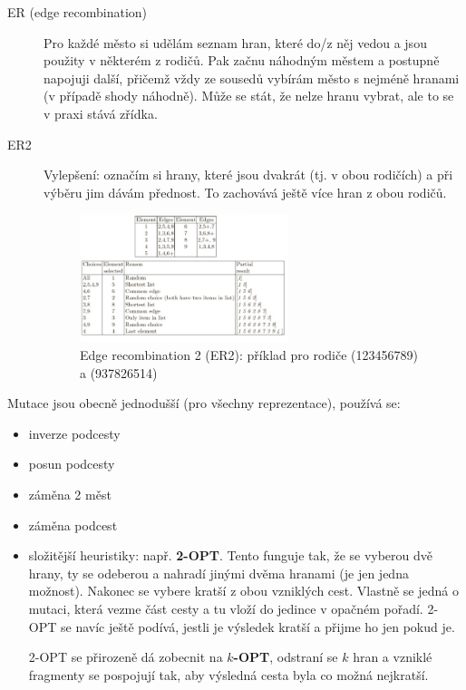\begin{description}
\begin{description}
		\item[ER (edge recombination)] Pro každé město si udělám seznam hran, které do/z něj vedou a jsou použity v některém z rodičů. Pak začnu náhodným městem a postupně napojuji další, přičemž vždy ze sousedů vybírám město s nejméně hranami (v případě shody náhodně). Může se stát, že nelze hranu vybrat, ale to se v praxi stává zřídka.
		\item[ER2] Vylepšení: označím si hrany, které jsou dvakrát (tj. v obou rodičích) a při výběru jim dávám přednost. To zachovává ještě více hran z obou rodičů.
		\begin{figure}[H]
			\centering			
			\smallskip
			\includegraphics[width=0.6\textwidth]{img/er.png}
			\caption{Edge recombination 2 (ER2): příklad pro rodiče (123456789) a (937826514)}
			\label{pmx}
			
		\end{figure}
		
	\end{description}
\end{description}



Mutace jsou obecně jednodušší (pro všechny reprezentace), používá se:
\begin{itemize}
	
	
	\item inverze podcesty
	\item posun podcesty
	\item záměna 2 měst
	\item záměna podcest
	\item složitější heuristiky: např. \textbf{2-OPT}. Tento  funguje tak, že se vyberou dvě hrany, ty se odeberou a nahradí jinými dvěma hranami (je jen jedna možnost). Nakonec se vybere kratší z obou vzniklých cest. Vlastně se jedná o mutaci, která vezme část cesty a tu vloží do jedince v opačném pořadí. 2-OPT se navíc ještě podívá, jestli je výsledek kratší a přijme ho jen pokud je.
	
	2-OPT se přirozeně dá zobecnit na \textbf{$k$-OPT}, odstraní se $k$ hran a vzniklé fragmenty se pospojují tak, aby výsledná cesta byla co možná nejkratší.
\end{itemize}

